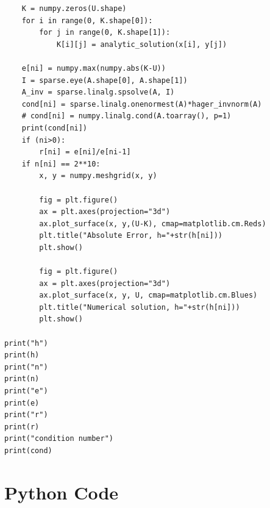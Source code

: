 \documentclass{template}
\begin{document}
\begin{verbatim}
    K = numpy.zeros(U.shape)
    for i in range(0, K.shape[0]):
        for j in range(0, K.shape[1]):
            K[i][j] = analytic_solution(x[i], y[j])

    e[ni] = numpy.max(numpy.abs(K-U))
    I = sparse.eye(A.shape[0], A.shape[1])
    A_inv = sparse.linalg.spsolve(A, I)
    cond[ni] = sparse.linalg.onenormest(A)*hager_invnorm(A)
    # cond[ni] = numpy.linalg.cond(A.toarray(), p=1)
    print(cond[ni])
    if (ni>0):
        r[ni] = e[ni]/e[ni-1]
    if n[ni] == 2**10:
        x, y = numpy.meshgrid(x, y)

        fig = plt.figure()
        ax = plt.axes(projection="3d")
        ax.plot_surface(x, y,(U-K), cmap=matplotlib.cm.Reds)
        plt.title("Absolute Error, h="+str(h[ni]))
        plt.show()

        fig = plt.figure()
        ax = plt.axes(projection="3d")
        ax.plot_surface(x, y, U, cmap=matplotlib.cm.Blues)
        plt.title("Numerical solution, h="+str(h[ni]))
        plt.show()

print("h")
print(h)
print("n")
print(n)
print("e")
print(e)
print("r")
print(r)
print("condition number")
print(cond)
\end{verbatim}





\appendix

\section{Python Code}\label{sec:code}
\end{document}
